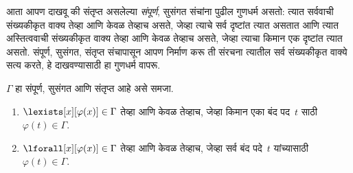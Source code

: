 \begin{explain}
आता आपण दाखवू की संतृप्त असलेल्या \emph{संपूर्ण}, सुसंगत संचांना पुढील
गुणधर्म असतो: त्यात सर्ववाची संख्यकीकृत वाक्य
  तेव्हा आणि केवळ तेव्हाच असते, जेव्हा त्याचे सर्व दृष्टांत त्यात असतात
   आणि त्यात अस्तित्ववाची
  संख्यकीकृत वाक्य तेव्हा आणि केवळ तेव्हाच असते, जेव्हा त्याचा
  किमान एक दृष्टांत त्यात असतो. संपूर्ण, सुसंगत, संतृप्त संचापासून
आपण निर्माण करू ती संरचना त्यातील सर्व संख्यकीकृत वाक्ये सत्य करते,
हे दाखवण्यासाठी हा गुणधर्म वापरू.
\end{explain}

\begin{prop}\label{fol:com:hen:prop:saturated-instances}
$\Gamma$ हा संपूर्ण, सुसंगत आणि संतृप्त आहे असे समजा.
\begin{enumerate}
\item $\lexists[x][\varphi(x)] \in \Gamma$ तेव्हा आणि केवळ तेव्हाच,
  जेव्हा किमान एका बंद पद~$t$ साठी $\varphi(t) \in \Gamma$.
\item $\lforall[x][\varphi(x)] \in \Gamma$ तेव्हा आणि केवळ तेव्हाच,
  जेव्हा सर्व बंद पदे~$t$ यांच्यासाठी $\varphi(t) \in \Gamma$.
\end{enumerate}
\end{prop}

